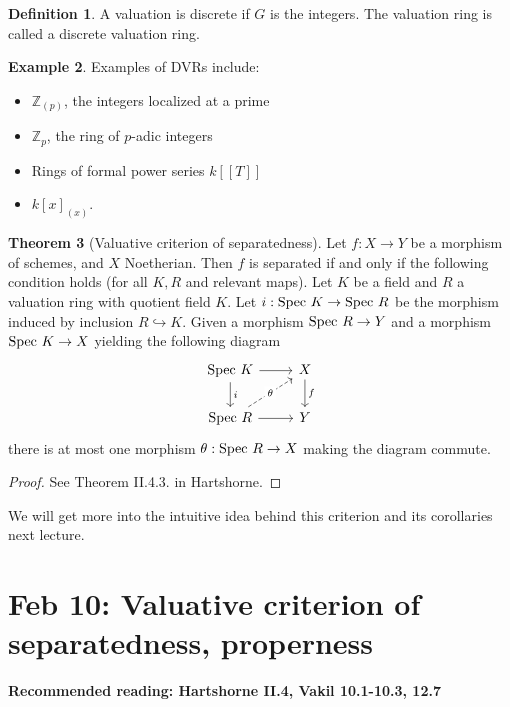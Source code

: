 \documentclass[10pt,reqno]{amsart}
\theoremstyle{definition}
\newtheorem{theorem}{Theorem}
\newtheorem{example}[theorem]{Example}
\newtheorem{definition}[theorem]{Definition}
\theoremstyle{remark}
\numberwithin{equation}{section}
\numberwithin{theorem}{section}
\newcommand{\Z}{{\mathbb Z}}
\newcommand{\spec}{\textup{Spec }}
\begin{document}
\begin{definition}
A valuation is discrete if $G$ is the integers. The valuation ring is called a discrete valuation ring.
\end{definition}

\begin{example} Examples of DVRs include:
\begin{itemize}
\item $\Z_{(p)}$, the integers localized at a prime
\item $\Z_p$, the ring of $p$-adic integers
\item Rings of formal power series $k[[T]]$
\item $k[x]_{(x)}$.
\end{itemize}
\end{example}

\begin{theorem}[Valuative criterion of separatedness] Let $f: X \to Y$ be a morphism of schemes, and $X$ Noetherian. Then $f$ is separated if and only if the following condition holds (for all $K,R$ and relevant maps). Let $K$ be a field and $R$ a valuation ring with quotient field $K$. Let $i: \spec K \to \spec R$ be the morphism induced by inclusion $R \hookrightarrow K$. Given a morphism $\spec R \to Y$ and a morphism $\spec K \to X$ yielding the following diagram
\[
\begin{tikzcd}
\spec K \arrow[d,"i"] \arrow[r] & X \arrow[d,"f"]\\
\spec R \arrow[r] \arrow[ur,dashed, "\theta" description]& Y
\end{tikzcd}
\]
there is at most one morphism $\theta: \spec R \to X$ making the diagram commute.
\end{theorem}
\begin{proof}
See Theorem II.4.3. in Hartshorne.
\end{proof}

We will get more into the intuitive idea behind this criterion and its corollaries next lecture.
\section{Feb 10: Valuative criterion of separatedness, properness}
\textbf{Recommended reading: Hartshorne II.4, Vakil 10.1-10.3, 12.7}
\end{document}
